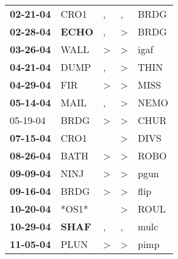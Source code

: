 \begin{supertabular}{p{0.07\textwidth}p{0.06\textwidth}p{0.02\textwidth}p{0.02\textwidth}p{0.06\textwidth}}
 \textbf{02-21-04\textsuperscript{}} &           CRO1\textsuperscript{} &                , &                , &           BRDG\textsuperscript{} \\
 \textbf{02-28-04\textsuperscript{}} &  \textbf{ECHO\textsuperscript{}} &                , &     \textgreater &           BRDG\textsuperscript{} \\
 \textbf{03-26-04\textsuperscript{}} &           WALL\textsuperscript{} &     \textgreater &     \textgreater &           igaf\textsuperscript{} \\
 \textbf{04-21-04\textsuperscript{}} &           DUMP\textsuperscript{} &                , &     \textgreater &           THIN\textsuperscript{} \\
 \textbf{04-29-04\textsuperscript{}} &            FIR\textsuperscript{} &     \textgreater &     \textgreater &           MISS\textsuperscript{} \\
 \textbf{05-14-04\textsuperscript{}} &           MAIL\textsuperscript{} &                , &     \textgreater &           NEMO\textsuperscript{} \\
          05-19-04\textsuperscript{} &           BRDG\textsuperscript{} &     \textgreater &     \textgreater &           CHUR\textsuperscript{} \\
 \textbf{07-15-04\textsuperscript{}} &           CRO1\textsuperscript{} &                  &     \textgreater &           DIVS\textsuperscript{} \\
 \textbf{08-26-04\textsuperscript{}} &           BATH\textsuperscript{} &     \textgreater &     \textgreater &           ROBO\textsuperscript{} \\
 \textbf{09-09-04\textsuperscript{}} &           NINJ\textsuperscript{} &     \textgreater &     \textgreater &           pgun\textsuperscript{} \\
 \textbf{09-16-04\textsuperscript{}} &           BRDG\textsuperscript{} &     \textgreater &     \textgreater &           flip\textsuperscript{} \\
 \textbf{10-20-04\textsuperscript{}} &                            *OS1* &                  &     \textgreater &           ROUL\textsuperscript{} \\
 \textbf{10-29-04\textsuperscript{}} &  \textbf{SHAF\textsuperscript{}} &                , &                , &           mulc\textsuperscript{} \\
 \textbf{11-05-04\textsuperscript{}} &           PLUN\textsuperscript{} &     \textgreater &     \textgreater &           pimp\textsuperscript{} \\

\end{supertabular}
